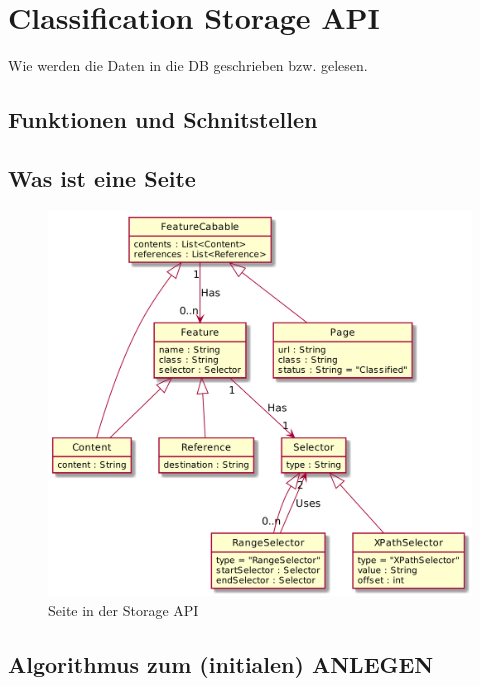 \section{Classification Storage API}
    Wie werden die Daten in die DB geschrieben bzw. gelesen.

    \subsection{Funktionen und Schnitstellen}

    \subsection{Was ist eine Seite}
        \begin{figure}
            \centering
            \includegraphics[width=\textwidth]{../resources/storage-api-data-model/page.png}
            \caption{Seite in der Storage API}
            \label{image:storageApiPageModel}
        \end{figure}

    \subsection{Algorithmus zum (initialen) ANLEGEN}
        